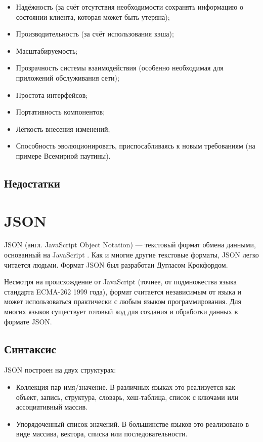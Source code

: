 \documentclass[a4page]{article}
\begin{document}
\begin{itemize}
	\item Надёжность (за счёт отсутствия необходимости сохранять информацию о состоянии клиента,
	      которая может быть утеряна);
	\item Производительность (за счёт использования кэша);
	\item Масштабируемость;
	\item Прозрачность системы взаимодействия (особенно необходимая для приложений обслуживания сети);
	\item Простота интерфейсов;
	\item Портативность компонентов;
	\item Лёгкость внесения изменений;
	\item Способность эволюционировать, приспосабливаясь к новым требованиям (на примере Всемирной паутины).
\end{itemize}

\subsection{Недостатки}

\newpage
\section{JSON}
JSON (англ. JavaScript Object Notation) ---
текстовый формат обмена данными, основанный на JavaScript \cite{rfc8259}\cite{ISO21778}.
Как и многие другие текстовые форматы, JSON легко читается людьми.
Формат JSON был разработан Дугласом Крокфордом.

Несмотря на происхождение от JavaScript
(точнее, от подмножества языка стандарта ECMA-262 1999 \cite{ecma:262} года),
формат считается независимым от языка и может использоваться практически с любым языком программирования.
Для многих языков существует готовый код для создания и обработки данных в формате JSON.

\subsection{Синтаксис}
JSON построен на двух структурах:

\begin{itemize}
	\item Коллекция пар имя/значение.
	      В различных языках это реализуется как объект, запись, структура, словарь, хеш-таблица,
	      список с ключами или ассоциативный массив.
	\item Упорядоченный список значений.
	      В большинстве языков это реализовано в виде массива, вектора, списка или последовательности.
\end{itemize}
\end{document}
